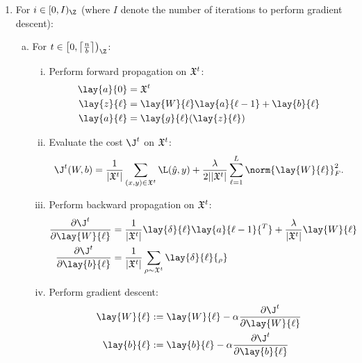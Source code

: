 \begin{enumerate}[1.]
	\item For $i\in[0, I)_\Z$ (where $I$ denote the number of iterations to perform gradient descent):
		\begin{enumerate}[a.]
			\item For $t\in\left[0,\left\lceil\frac{n}{b}\right\rceil\right)_\Z$:
			\begin{enumerate}[i.]
				\item Perform forward propagation on $\frak{X}^t$:
				\begin{align*}
					\lay{a}{0}&=\frak{X}^t\\
					\lay{z}{\ell}&=\lay{W}{\ell}\lay{a}{\ell-1}+\lay{b}{\ell}\\
					\lay{a}{\ell}&=\lay{g}{\ell}(\lay{z}{\ell})
				\end{align*}
				\item Evaluate the cost $\J^t$ on $\frak{X}^t$:
				$$\J^t(W,b)=\frac{1}{|\frak{X}^t|}\sum_{(x,y)\in\frak{X}^t}\L(\hat{y},y)+\frac{\lambda}{2||\frak{X}^t|}\sum_{\ell=1}^L\norm{\lay{W}{\ell}}_F^2.$$
				\item Perform backward propagation on $\frak{X}^t$:
				\begin{align*}
					\frac{\partial\J^t}{\partial\lay{W}{\ell}}&=\frac{1}{|\frak{X}^t|}\lay{\delta}{\ell}\lay{a}{\ell - 1}{^T}+\frac{\lambda}{|\frak{X}^t|}\lay{W}{\ell}\\
					\frac{\partial\J^t}{\partial\lay{b}{\ell}}&=\frac{1}{|\frak{X}^t|}\sum_{\rho\sim\frak{X}^t}\lay{\delta}{\ell}{_\rho}
				\end{align*}
				\item Perform gradient descent:
				\begin{align*}
					\lay{W}{\ell}&:=\lay{W}{\ell}-\alpha \frac{\partial\J^t}{\partial\lay{W}{\ell}}\\
					\lay{b}{\ell}&:=\lay{b}{\ell}-\alpha \frac{\partial\J^t}{\partial\lay{b}{\ell}}
				\end{align*}
			\end{enumerate}
		\end{enumerate}
\end{enumerate}

